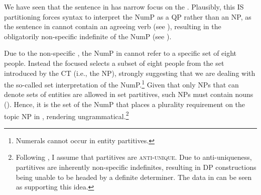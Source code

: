 \documentclass[output=paper,modfonts,newtxmath,hidelinks]{langscibook}
\begin{document}
\noindent We have seen that the sentence in  has narrow focus on the . Plausibly, this IS partitioning forces syntax to interpret the NumP as a QP rather than an NP, as the sentence in  cannot contain an agreeing verb (see ), resulting in the obligatorily non-specific indefinite  of the NumP (see ).

\label{18:ex24}
\z
 \label{18:ex25}
\z

\noindent Due to the non-specific , the NumP in  cannot refer to a specific set of eight people. Instead the focused  selects a subset of eight people from the set introduced by the CT (i.e., the NP), strongly suggesting that we are dealing with the so-called set  interpretation of the NumP.\footnote{\label{18:fn20}Numerals cannot occur in entity partitives.}
Given that only NPs that can denote sets of entities are allowed in set partitives, such NPs must contain  nouns (\citealt{deHoop1997}). Hence, it is the set   of the NumP that places a plurality requirement on the topic NP in , rendering  ungrammatical.\footnote{\label{18:fn21}Following \citet{Barker1998}, I assume that partitives are \textsc{anti-unique}. Due to anti-uniqueness, partitives are inherently non-specific indefinites, resulting in DP  constructions being unable to be headed by a definite determiner. The data in  can be seen as supporting this idea.}

\end{document}

